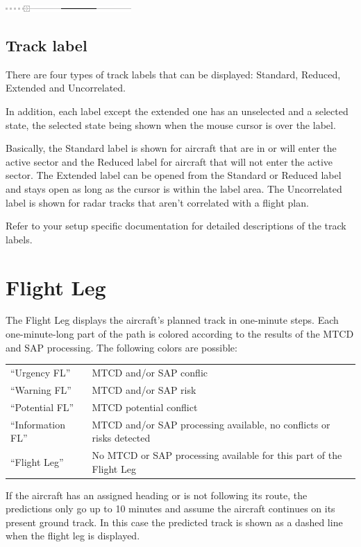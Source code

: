 \documentclass[11pt,a4paper,oldfontcommands]{memoir}
\begin{document}
\includegraphics{img/rps_predline+history_selected.png}

\subsection{Track label}
There are four types of track labels that can be displayed: Standard, Reduced, Extended and Uncorrelated.

In addition, each label except the extended one has an unselected and a selected state, the selected state
being shown when the mouse cursor is over the label.
\medskip

Basically, the Standard label is shown for aircraft that are in or will enter the active sector and the Reduced
label for aircraft that will not enter the active sector. The Extended label can be opened from the Standard
or Reduced label and stays open as long as the cursor is within the label area. The Uncorrelated label is
shown for radar tracks that aren’t correlated with a flight plan.
\medskip

Refer to your setup specific documentation for detailed descriptions of the track labels.\\

\section{Flight Leg}
The Flight Leg displays the aircraft’s planned track in one-minute steps. Each one-minute-long part of the
path is colored according to the results of the MTCD and SAP processing. The following colors are possible:
\medskip

\begin{tabular}{l l}
“Urgency FL”        & MTCD and/or SAP conflic\\
“Warning FL”      & MTCD and/or SAP risk\\
“Potential FL”    & MTCD potential conflict\\
“Information FL”  & MTCD and/or SAP processing available, no conflicts or risks detected\\
“Flight Leg”      & No MTCD or SAP processing available for this part of the Flight Leg\\
\end{tabular}
\medskip

If the aircraft has an assigned heading or is not following its route, the predictions only go up to 10 minutes
and assume the aircraft continues on its present ground track. In this case the predicted track is shown as a
dashed line when the flight leg is displayed.
\end{document}
